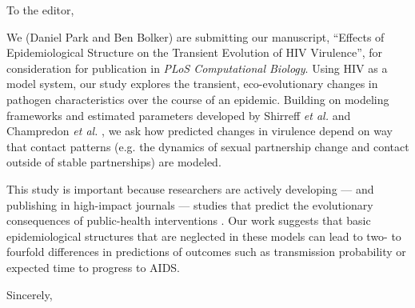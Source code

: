 \documentclass[10pt]{letter}
\begin{document}
\date{\today}

\signature{\texttt{[image: bbsig3.png]}\\Benjamin Bolker}

\begin{letter}{
} 

\opening{To the editor,}

We (Daniel Park and Ben Bolker) are submitting our manuscript, ``Effects of Epidemiological Structure on the Transient Evolution of HIV Virulence'', for consideration for publication in \emph{PLoS Computational Biology}. Using HIV as a model system, our study explores the transient, eco-evolutionary changes in pathogen characteristics over the course of an epidemic. Building on modeling frameworks and estimated parameters developed by Shirreff \emph{et al.} \cite{shirreff_transmission_2011} and Champredon \emph{et al.} \cite{champredon_hiv_2013}, we ask how predicted changes in virulence depend on way that contact patterns (e.g. the dynamics of sexual partnership change and contact outside of stable partnerships) are modeled.

This study is important because researchers are actively developing --- and publishing in high-impact journals --- studies that predict the evolutionary consequences of public-health interventions \cite{payne_impact_2014,roberts2015impact,herbeck2016evolution}. Our work suggests that basic epidemiological structures that are neglected in these models can lead to two- to fourfold differences in predictions of outcomes such as transmission probability or expected time to progress to AIDS.


\closing{Sincerely,}



\end{letter}
\end{document}
